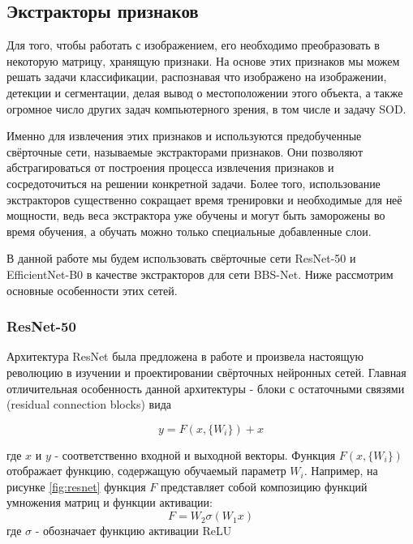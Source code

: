 \subsection{Экстракторы признаков}

Для того, чтобы работать с изображением, его необходимо преобразовать
в некоторую матрицу, хранящую признаки. На основе этих
признаков мы можем решать задачи классификации, распознавая что изображено на изображении,
детекции и сегментации, делая вывод о местоположении этого объекта,
а также огромное число других задач компьютерного зрения, в том числе и задачу SOD.

Именно для извлечения этих признаков и используются предобученные свёрточные сети, называемые экстракторами признаков. Они позволяют
абстрагироваться от построения процесса извлечения признаков и сосредоточиться на решении конкретной задачи.
Более того, использование экстракторов существенно сокращает время тренировки и необходимые для неё мощности,
ведь веса экстрактора уже обучены и могут быть заморожены во время обучения, а обучать можно только специальные добавленные слои.


В данной работе мы будем использовать свёрточные сети ResNet-50\cite{ResNet} и EfficientNet-B0\cite{Efficientnet}
в качестве экстракторов для сети BBS-Net\cite{BBS}. Ниже рассмотрим основные особенности этих сетей.

\subsubsection{ResNet-50}

Архитектура ResNet была предложена в работе \cite{ResNet} и произвела настоящую революцию
в изучении и проектировании свёрточных нейронных сетей. Главная отличительная особенность данной архитектуры -
блоки с остаточными связями (residual connection blocks) вида

\begin{equation}
    y = F(x, \{W_i\}) + x
\end{equation}

где $x$ и $y$ - соответственно входной и выходной векторы. Функция $F(x, \{W_i\})$ отображает
функцию, содержащую обучаемый параметр $W_i$. Например, на рисунке \ref{fig:resnet} функция $F$
представляет собой композицию функций умножения матриц и функции активации:
\begin{equation}
    F = W_2 \sigma(W_1x)
\end{equation}
где $\sigma$ - обозначает функцию активации ReLU\cite{ReLU}


